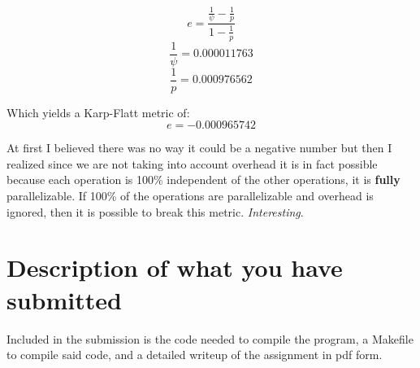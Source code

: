 \documentclass{article}
\begin{document}
$$e = \frac{\frac{1}{\psi} - \frac{1}{p}}{1 - \frac{1}{p}}$$
$$\frac{1}{\psi} = 0.000011763$$
$$\frac{1}{p} = 0.000976562$$

Which yields a Karp-Flatt metric of:
$$e = -0.000965742$$

At first I believed there was no way it could be a negative number but then I 
realized since we are not taking into account overhead it is in fact possible 
because each operation is 100\% independent of the other operations, it is 
\textbf{fully} parallelizable. If 100\% of the operations are parallelizable and 
overhead is ignored, then it is possible to break this metric. 
\textit{Interesting}.


\section{Description of what you have submitted}
Included in the submission is the code needed to compile the program, a Makefile 
to compile said code, and a detailed writeup of the assignment in pdf form.
\end{document}

